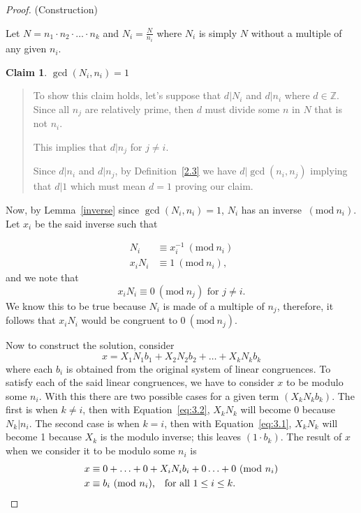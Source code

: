 \documentclass[12pt,a4paper,reqno,parskip=full]{amsart}
\numberwithin{equation}{section}
\theoremstyle{plain}
\newtheorem{claim}[subsection]{Claim}
\theoremstyle{definition}
\newcommand{\Mod}[1]{\ (\mathrm{mod}\ #1)}
\def\Z{{\mathbb Z}}
\begin{document}
\begin{proof}
	(Construction)

	Let $N = n_1 \cdot n_2 \cdot \ldots \cdot n_k$ and $N_i = \frac{N}{n_i}$ where $N_i$ is simply $N$ without a multiple of any given $n_i$. 

	\begin{claim}
		$\gcd(N_i, n_i) = 1$
	\end{claim}

	\begin{quote}
		To show this claim holds, let's suppose that $d|N_i$ and $d|n_i$ where $d \in \Z$. Since all $n_j$ are relatively prime, then $d$ must divide some $n$ in $N$ that is not $n_i$.

		This implies that $d|n_j$ for $j \ne i$.

		Since $d|n_i$ and $d|n_j$, by Definition~\ref{2.3} we have $d | \gcd(n_i, n_j)$ implying that $d|1$ which must mean $d=1$ proving our claim.
	\end{quote}

	Now, by Lemma~\ref{inverse} since $\gcd(N_i, n_i) = 1$, $N_i$ has an inverse $\Mod{n_i}$. Let $x_i$ be the said inverse such that

	\begin{align*}
		N_i &\equiv x_i^{-1} \Mod{n_i} \label{eq:3.1} \tag{3.1}\\
		x_iN_i &\equiv 1 \Mod{n_i},
	\end{align*}
	and we note that 
	\begin{equation*}
		x_iN_i \equiv 0 \Mod{n_j} \text{ for } j \ne i \label{eq:3.2} \tag{3.2}.
	\end{equation*}
	We know this to be true because $N_i$ is made of a multiple of $n_j$, therefore, it follows that $x_iN_i$ would be congruent to $0 \Mod{n_j}$.

	Now to construct the solution, consider $$x = X_1N_1b_1 + X_2N_2b_2 + \ldots + X_kN_kb_k$$ where each $b_i$ is obtained from the original system of linear congruences. To satisfy each of the said linear congruences, we have to consider $x$ to be modulo some $n_i$. With this there are two possible cases for a given term $(X_kN_kb_k)$. The first is when $k\ne i$, then with Equation~\ref{eq:3.2}, $X_kN_k$ will become 0 because $N_k | n_i$. The second case is when $k = i$, then with Equation~\ref{eq:3.1}, $X_kN_k$ will become 1 because $X_k$ is the modulo inverse; this leaves $(1 \cdot b_k)$. The result of $x$ when we consider it to be modulo some $n_i$ is
	\begin{align*}
		x &\equiv 0 + \ldots + 0 + X_iN_ib_i + 0 \ldots + 0 \Mod{n_i}\\
		x &\equiv b_i \Mod{n_i} \text{,\quad for all } 1 \le i \le k.
	\end{align*}


\end{proof}
\end{document}
